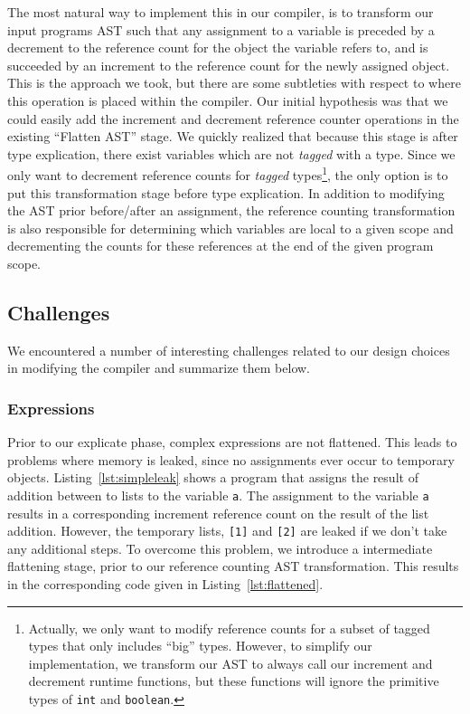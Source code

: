 \documentclass{sigplanconf}
\begin{document}
The most natural way to implement this in our compiler, is to transform our input programs AST such that any assignment to a variable is preceded by a decrement to the reference count for the object the variable refers to, and is succeeded by an increment to the reference count for the newly assigned object.  This is the approach we took, but there are some subtleties with respect to where this operation is placed within the compiler.  Our initial hypothesis was that we could easily add the increment and decrement reference counter operations in the existing ``Flatten AST'' stage.  We quickly realized that because this stage is after type explication, there exist variables which are not \textit{tagged} with a type.  Since we only want to decrement reference counts for \textit{tagged} types\footnote{Actually, we only want to modify reference counts for a subset of tagged types that only includes ``big'' types. However, to simplify our implementation, we transform our AST to always call our increment and decrement runtime functions, but these functions will ignore the primitive types of \texttt{int} and \texttt{boolean}.}, the only option is to put this transformation stage before type explication.  In addition to modifying the AST prior before/after an assignment, the reference counting transformation is also responsible for determining which variables are local to a given scope and decrementing the counts for these references at the end of the given program scope.

\subsection{Challenges}
We encountered a number of interesting challenges related to our design choices in modifying the compiler and summarize them below.

\subsubsection{Expressions}
Prior to our explicate phase, complex expressions are not flattened.  This leads to problems where memory is leaked, since no assignments ever occur to temporary objects.  Listing~\ref{lst:simpleleak} shows a program that assigns the result of addition between to lists to the variable \texttt{a}.  The assignment to the variable \texttt{a} results in a corresponding increment reference count on the result of the list addition.  However, the temporary lists, \texttt{[1]} and \texttt{[2]} are leaked if we don't take any additional steps.  To overcome this problem, we introduce a intermediate flattening stage, prior to our reference counting AST transformation.   This results in the corresponding code given in Listing~\ref{lst:flattened}.
\end{document}
